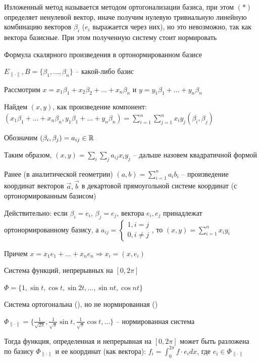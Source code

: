 \documentclass[12pt]{article}
\begin{document}
    Изложенный метод называется методом ортогонализации базиса, при этом $(*)$ определяет ненулевой вектор, 
    иначе получим нулевую тривиальную линейную комбинацию векторов $\beta_i$ ($e_i$ выражается через них), но это невозможно, 
    так как вектора базисные.
    При этом полученную систему стоит нормировать

    \Ex Формула скалярного произведения в ортонормированном базисе

    $E_{\|\cdot\|}, B = \{\beta_1, \dots, \beta_n\}$ -- какой-либо базис

    Рассмотрим $x = x_1 \beta_1 + x_2 \beta_2 + \dots + x_n \beta_n$ и $y = y_1 \beta_1 + \dots + y_n \beta_n$

    Найдем $(x, y)$, как произведение компонент: $(x_1 \beta_1 + \dots + x_n \beta_n, y_1 \beta_1 + \dots + y_n \beta_n) = \sum_{i = 1}^n \sum_{j = 1}^n x_i y_j (\beta_i, \beta_j)$

    Обозначим $(\beta_i, \beta_j) = a_{ij} \in \mathbb{R}$

    Таким образом, $(x, y) = \sum_i \sum_j a_{ij} x_i y_j$ -- дальше назовем квадратичной формой

    Ранее (в аналитической геометрии) $(a, b) = \sum_{i = 1}^n a_i b_i$ -- произведение координат векторов $\vec{a}, \vec{b}$ в
    декартовой прямоугольной системе координат (с ортонормированным базисом)

    Действительно: если $\beta_i = e_i$, $\beta_j = e_j$, вектора $e_i, e_j$ принадлежат ортонормированному базису, 
    а $a_{ij} = \begin{cases}1, i = j \\ 0, i \neq j\end{cases}$, то $(x, y) = \sum_{i = 1}^n x_i y_i$

    Причем $x = x_1 e_1 + \dots + x_n e_n \Longrightarrow x_i = (x, e_i)$

    \Ex Система функций, непрерывных на $[0, 2\pi]$

    $\Phi = \{1, \sin t, \cos t, \sin 2t, \dots, \sin nt, \cos nt\}$

    Система ортогональна (\Lab), но не нормированная (\Lab)

    $\Phi_{\|\cdot\|} = \{\frac{1}{\sqrt{2\pi}}, \frac{1}{\sqrt{\pi}}\sin t, \frac{1}{\sqrt{\pi}} \cos t, \dots\}$ -- нормированная система

    Тогда функция, определенная и непрерывная на $[0, 2\pi]$ может быть разложена по базису $\Phi_{\|\cdot\|}$
    и ее координат (как вектора): $f_i = \int_0^{2\pi} f \cdot e_i dx$, где $e_i \in \Phi_{\|\cdot\|}$
\end{document}

